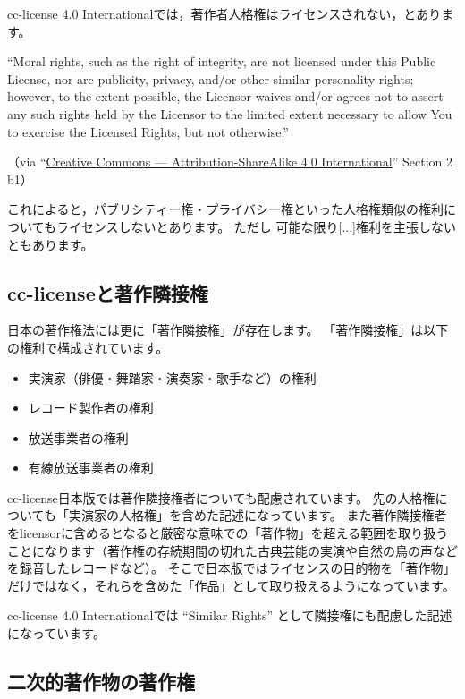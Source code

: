 \documentclass{ltjsarticle}
\begin{document}
cc-license 4.0 Internationalでは，著作者人格権はライセンスされない，とあります。
\begin{mdframed}
 ``Moral rights, such as the right of integrity, are not licensed under this Public License, nor are publicity, privacy, and/or other similar personality rights; however, to the extent possible, the Licensor waives and/or agrees not to assert any such rights held by the Licensor to the limited extent necessary to allow You to exercise the Licensed Rights, but not otherwise.'' \par
（via  ``\href{http://creativecommons.org/licenses/by-sa/4.0/legalcode}{Creative Commons — Attribution-ShareAlike 4.0 International}''  Section 2 b1）
\end{mdframed}
これによると，パブリシティー権・プライバシー権といった人格権類似の権利についてもライセンスしないとあります。
ただし 可能な限り[...]権利を主張しない ともあります。


\subsection{cc-licenseと著作隣接権}

日本の著作権法には更に「著作隣接権」が存在します。
「著作隣接権」は以下の権利で構成されています。
\begin{itemize}
\item 実演家（俳優・舞踏家・演奏家・歌手など）の権利
\item レコード製作者の権利
\item 放送事業者の権利
\item 有線放送事業者の権利
\end{itemize}
cc-license日本版では著作隣接権者についても配慮されています。
先の人格権についても「実演家の人格権」を含めた記述になっています。
また著作隣接権者をlicensorに含めるとなると厳密な意味での「著作物」を超える範囲を取り扱うことになります（著作権の存続期間の切れた古典芸能の実演や自然の鳥の声などを録音したレコードなど）。
そこで日本版ではライセンスの目的物を「著作物」だけではなく，それらを含めた「作品」として取り扱えるようになっています。

cc-license 4.0 Internationalでは ``Similar Rights'' として隣接権にも配慮した記述になっています。


\subsection{二次的著作物の著作権} \label{sec:adaptations}
\end{document}
